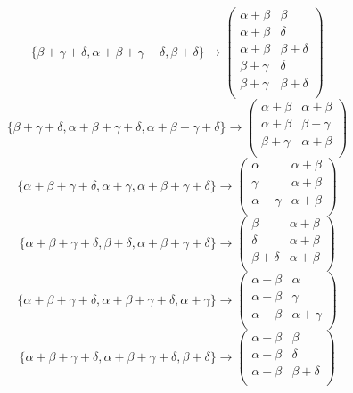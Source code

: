 \documentclass[12pt]{article}
\begin{document}
$$
\{\beta +\gamma +\delta ,\alpha +\beta +\gamma +\delta ,\beta +\delta \}\to \left(
\begin{array}{cc}
 \alpha +\beta  & \beta  \\
 \alpha +\beta  & \delta  \\
 \alpha +\beta  & \beta +\delta  \\
 \beta +\gamma  & \delta  \\
 \beta +\gamma  & \beta +\delta  \\
\end{array}
\right)
$$
$$
\{\beta +\gamma +\delta ,\alpha +\beta +\gamma +\delta ,\alpha +\beta +\gamma +\delta \}\to \left(
\begin{array}{cc}
 \alpha +\beta  & \alpha +\beta  \\
 \alpha +\beta  & \beta +\gamma  \\
 \beta +\gamma  & \alpha +\beta  \\
\end{array}
\right)
$$
$$
\{\alpha +\beta +\gamma +\delta ,\alpha +\gamma ,\alpha +\beta +\gamma +\delta \}\to \left(
\begin{array}{cc}
 \alpha  & \alpha +\beta  \\
 \gamma  & \alpha +\beta  \\
 \alpha +\gamma  & \alpha +\beta  \\
\end{array}
\right)
$$
$$
\{\alpha +\beta +\gamma +\delta ,\beta +\delta ,\alpha +\beta +\gamma +\delta \}\to \left(
\begin{array}{cc}
 \beta  & \alpha +\beta  \\
 \delta  & \alpha +\beta  \\
 \beta +\delta  & \alpha +\beta  \\
\end{array}
\right)
$$
$$
\{\alpha +\beta +\gamma +\delta ,\alpha +\beta +\gamma +\delta ,\alpha +\gamma \}\to \left(
\begin{array}{cc}
 \alpha +\beta  & \alpha  \\
 \alpha +\beta  & \gamma  \\
 \alpha +\beta  & \alpha +\gamma  \\
\end{array}
\right)
$$
$$
\{\alpha +\beta +\gamma +\delta ,\alpha +\beta +\gamma +\delta ,\beta +\delta \}\to \left(
\begin{array}{cc}
 \alpha +\beta  & \beta  \\
 \alpha +\beta  & \delta  \\
 \alpha +\beta  & \beta +\delta  \\
\end{array}
\right)
$$
\end{document}
